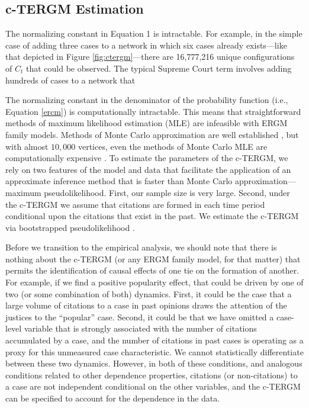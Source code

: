 \documentclass[headsepline=true, abstracton]{scrartcl}
\begin{document}
\subsection{c-TERGM Estimation}

The normalizing constant in Equation 1 is intractable. For example, in the simple case of adding three cases to a network in which six cases already exists---like that depicted in Figure \ref{fig:ctergm}---there are 16,777,216 unique configurations of $C_t$ that could be observed. The typical Supreme Court term involves adding hundreds of cases to a network that 


\indent The normalizing constant in the denominator of the probability function (i.e., Equation \ref{ercm}) is computationally intractable. This means that straightforward methods of maximum likelihood estimation (MLE) are infeasible with ERGM family models. Methods of Monte Carlo approximation are well established \citep{hunter2006inference,van2009framework,hummel2012improving}, but with almost $10,000$ vertices, even the methods of Monte Carlo MLE are computationally expensive \citep{schmid2017exponential}. To estimate the parameters of the c-TERGM, we rely on two features of the model and data that facilitate the application of an approximate inference method that is faster than Monte Carlo approximation---maximum pseudolikelihood. First, our sample size is very large. Second, under the c-TERGM we assume that citations are formed in each time period conditional upon the citations that exist in the past.  We estimate the c-TERGM via bootstrapped pseudolikelihood \citep{desmarais2012statistical,desmarais2010consistent}. 


Before we transition to the empirical analysis, we should note that there is nothing about the c-TERGM (or any ERGM family model, for that matter) that permits the identification of causal effects of one tie on the formation of another. For example, if we find a positive popularity effect, that could be driven by one of two (or some combination of both) dynamics. First, it could be the case that a large volume of citations to a case in past opinions draws the attention of the justices to the ``popular'' case. Second, it could be that we have omitted a case-level variable that is strongly associated with the number of citations accumulated by a case, and the number of citations in past cases is operating as a proxy for this unmeasured case characteristic. We cannot statistically differentiate between these two dynamics. However, in both of these conditions, and analogous conditions related to other dependence properties, citations (or non-citations) to a case are not independent conditional on the other variables, and the c-TERGM can be specified to account for the dependence in the data.
\end{document}
